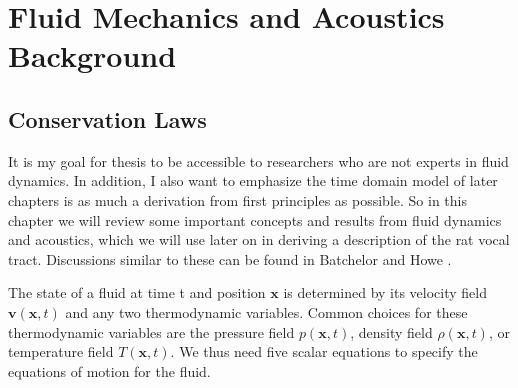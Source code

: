 \documentclass[12pt, letter]{report}
\begin{document}
\chapter{Fluid Mechanics and Acoustics Background}
\section{Conservation Laws}
It is my goal for thesis to be accessible to researchers who are not experts in fluid dynamics. In addition, I also want to emphasize the time domain model of later chapters is as much a derivation from first principles as possible. So in this chapter we will review some important concepts and results from fluid dynamics and acoustics, which we will use later on in deriving a description of the rat vocal tract. Discussions similar to these can be found in Batchelor \cite{Batchelor2000} and Howe \cite{howe2003theory}. 

The state of a fluid at time t and position $\textbf{x}$ is determined by its velocity field $\textbf{v}(\textbf{x}, t)$ and any two thermodynamic variables. Common choices for these thermodynamic variables are the pressure field $p(\textbf{x}, t)$, density field $\rho(\textbf{x}, t)$, or temperature field $T(\textbf{x}, t)$. We thus need five scalar equations to specify the equations of motion for the fluid.
\end{document}
